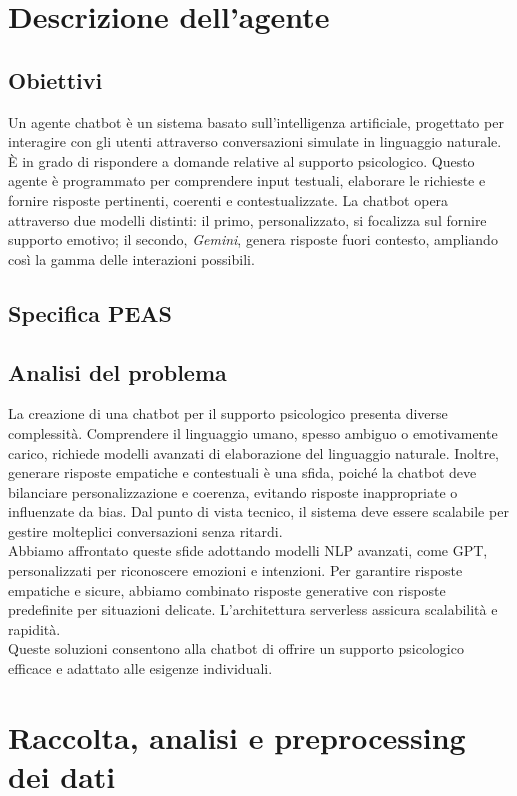 \documentclass[12pt, letterpaper]{article}
\begin{document}
\section{Descrizione dell'agente}
	
\subsection{Obiettivi}
Un agente chatbot è un sistema basato sull'intelligenza artificiale, progettato per interagire con gli utenti attraverso conversazioni simulate in linguaggio naturale. È in grado di rispondere a domande relative al supporto psicologico. Questo agente è programmato per comprendere input testuali, elaborare le richieste e fornire risposte pertinenti, coerenti e contestualizzate.
La chatbot opera attraverso due modelli distinti: il primo, personalizzato, si focalizza sul fornire supporto emotivo; il secondo, \textit{Gemini}, genera risposte fuori contesto, ampliando così la gamma delle interazioni possibili.

\subsection{Specifica PEAS}
\subsection{Analisi del problema}
La creazione di una chatbot per il supporto psicologico presenta diverse complessità. Comprendere il linguaggio umano, spesso ambiguo o emotivamente carico, richiede modelli avanzati di elaborazione del linguaggio naturale. Inoltre, generare risposte empatiche e contestuali è una sfida, poiché la chatbot deve bilanciare personalizzazione e coerenza, evitando risposte inappropriate o influenzate da bias. Dal punto di vista tecnico, il sistema deve essere scalabile per gestire molteplici conversazioni senza ritardi. \\
Abbiamo affrontato queste sfide adottando modelli NLP avanzati, come GPT, personalizzati per riconoscere emozioni e intenzioni. Per garantire risposte empatiche e sicure, abbiamo combinato risposte generative con risposte predefinite per situazioni delicate. L’architettura serverless assicura scalabilità e rapidità.\\ Queste soluzioni consentono alla chatbot di offrire un supporto psicologico efficace e adattato alle esigenze individuali.

\section{Raccolta, analisi e preprocessing dei dati}
\end{document}
